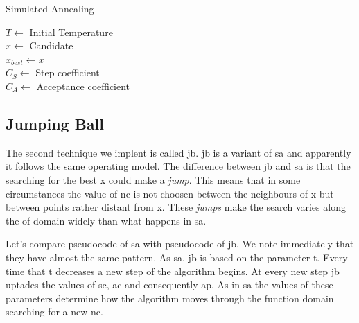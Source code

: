 \documentclass[journal]{IEEEtran}
\begin{document}
\begin{algorithm}
\caption{Simulated Annealing}
$T \gets$ Initial Temperature \\
$x \gets$ Candidate \\
$x_{best} \gets x$ \\
$C_S \gets$ Step coefficient \\
$C_A \gets$ Acceptance coefficient \\

\end{algorithm} %

\subsection{Jumping Ball}

The second technique we implent is called \gls{jb}. \gls{jb} is a variant of \gls{sa} and apparently it follows the same operating model. The difference between \gls{jb} and \gls{sa} is that the searching for the best \gls{x} could make a \textit{jump}. This means that in some circumstances the value of \gls{nc} is not choosen between the neighbours of \gls{x} but between points rather distant from \gls{x}. These \textit{jumps} make the search  varies along the \gls{of} domain widely than what happens in \gls{sa}.

Let's compare pseudocode of \gls{sa} with pseudocode of \gls{jb}. We note immediately that they have almost the same pattern. As \gls{sa}, \gls{jb} is based on the parameter \gls{t}. Every time that \gls{t} decreases a new step of the algorithm begins. At every new step \gls{jb} uptades the values of \gls{sc}, \gls{ac} and consequently \gls{ap}. As in \gls{sa} the values of these parameters determine how the algorithm moves through the function domain searching for a new \gls{nc}.
\end{document}
